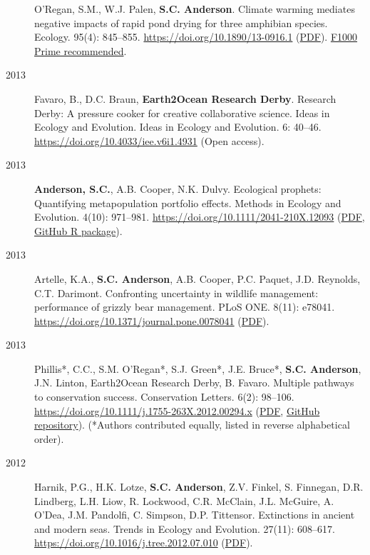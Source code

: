 \begin{description}
O'Regan, S.M., W.J. Palen, \textbf{S.C. Anderson}. Climate warming
mediates negative impacts of rapid pond drying for three amphibian
species. Ecology. 95(4): 845--855.
\url{https://doi.org/10.1890/13-0916.1}
(\href{http://onlinelibrary.wiley.com/doi/10.1890/13-0916.1/epdf}{PDF}).
\href{https://facultyopinions.com/prime/718498042}{F1000 Prime
recommended}.
\item[2013]
Favaro, B., D.C. Braun, \textbf{Earth2Ocean Research Derby}. Research
Derby: A pressure cooker for creative collaborative science. Ideas in
Ecology and Evolution. Ideas in Ecology and Evolution. 6: 40--46.
\url{https://doi.org/10.4033/iee.v6i1.4931} (Open access).
\item[2013]
\textbf{Anderson, S.C.}, A.B. Cooper, N.K. Dulvy. Ecological prophets:
Quantifying metapopulation portfolio effects. Methods in Ecology and
Evolution. 4(10): 971--981.
\url{https://doi.org/10.1111/2041-210X.12093}
(\href{https://www.dropbox.com/s/7tx1h1pkmmp222j/Anderson_etal_2013_ecological_prophets_with_SOM.pdf?dl=1}{PDF},
\href{https://github.com/seananderson/ecofolio}{GitHub R package}).
\item[2013]
Artelle, K.A., \textbf{S.C. Anderson}, A.B. Cooper, P.C. Paquet, J.D.
Reynolds, C.T. Darimont. Confronting uncertainty in wildlife management:
performance of grizzly bear management. PLoS ONE. 8(11): e78041.
\url{https://doi.org/10.1371/journal.pone.0078041}
(\href{http://www.plosone.org/article/fetchObject.action?uri=info\%3Adoi\%2F10.1371\%2Fjournal.pone.0078041\&representation=PDF}{PDF}).
\item[2013]
Phillis*, C.C., S.M. O'Regan*, S.J. Green*, J.E. Bruce*, \textbf{S.C.
Anderson}, J.N. Linton, Earth2Ocean Research Derby, B. Favaro. Multiple
pathways to conservation success. Conservation Letters. 6(2): 98--106.
\url{https://doi.org/10.1111/j.1755-263X.2012.00294.x}
(\href{https://www.dropbox.com/s/cxt848ng5x4hc4t/Phillis_etal_2012_Multiple_pathways_to_conservation_success.pdf?dl=1}{PDF},
\href{https://github.com/seananderson/conservation_pathways}{GitHub
repository}). (*Authors contributed equally, listed in reverse
alphabetical order).
\item[2012]
Harnik, P.G., H.K. Lotze, \textbf{S.C. Anderson}, Z.V. Finkel, S.
Finnegan, D.R. Lindberg, L.H. Liow, R. Lockwood, C.R. McClain, J.L.
McGuire, A. O'Dea, J.M. Pandolfi, C. Simpson, D.P. Tittensor.
Extinctions in ancient and modern seas. Trends in Ecology and Evolution.
27(11): 608--617. \url{https://doi.org/10.1016/j.tree.2012.07.010}
(\href{https://www.dropbox.com/s/rdn9685viqr37qy/Harnik_etal_2012_Extinctions_in_ancient_and_modern_seas.pdf?dl=1}{PDF}).

\end{description}
